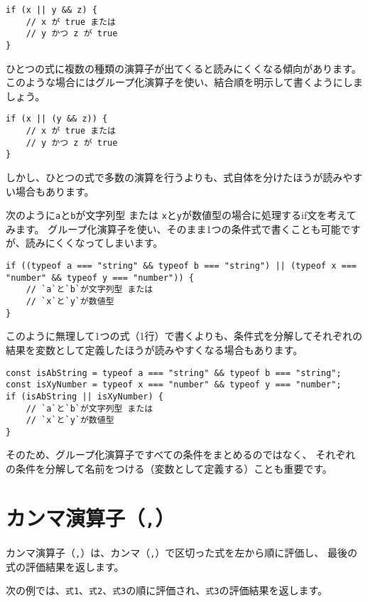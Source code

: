 \begin{lstlisting}
if (x || y && z) {
    // x が true または
    // y かつ z が true
}
\end{lstlisting}

ひとつの式に複数の種類の演算子が出てくると読みにくくなる傾向があります。
このような場合にはグループ化演算子を使い、結合順を明示して書くようにしましょう。

\begin{lstlisting}
if (x || (y && z)) {
    // x が true または
    // y かつ z が true
}
\end{lstlisting}

しかし、ひとつの式で多数の演算を行うよりも、式自体を分けたほうが読みやすい場合もあります。

次のように\texttt{a}と\texttt{b}が文字列型
または
\texttt{x}と\texttt{y}が数値型の場合に処理するif文を考えてみます。
グループ化演算子を使い、そのまま1つの条件式で書くことも可能ですが、読みにくくなってしまいます。

\begin{lstlisting}
if ((typeof a === "string" && typeof b === "string") || (typeof x === "number" && typeof y === "number")) {
    // `a`と`b`が文字列型 または
    // `x`と`y`が数値型
}
\end{lstlisting}

このように無理して1つの式（1行）で書くよりも、条件式を分解してそれぞれの結果を変数として定義したほうが読みやすくなる場合もあります。

\begin{lstlisting}
const isAbString = typeof a === "string" && typeof b === "string";
const isXyNumber = typeof x === "number" && typeof y === "number";
if (isAbString || isXyNumber) {
    // `a`と`b`が文字列型 または
    // `x`と`y`が数値型
}
\end{lstlisting}

そのため、グループ化演算子ですべての条件をまとめるのではなく、
それぞれの条件を分解して名前をつける（変数として定義する）ことも重要です。

\hypertarget{comma-operator}{%
\section{\texorpdfstring{カンマ演算子（\texttt{,}）}{カンマ演算子（,）}}\label{comma-operator}}

カンマ演算子（\texttt{,}）は、カンマ（\texttt{,}）で区切った式を左から順に評価し、
最後の式の評価結果を返します。

次の例では、\texttt{式1}、\texttt{式2}、\texttt{式3}の順に評価され、\texttt{式3}の評価結果を返します。

